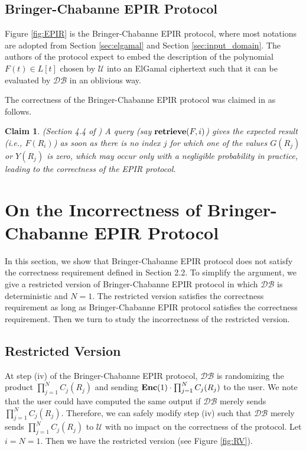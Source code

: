 \documentclass[JMC]{degruyter-journal}
\newtheorem{claim}{Claim}[section]
\begin{document}
\subsection{Bringer-Chabanne EPIR Protocol  }


Figure \ref{fig:EPIR} is the Bringer-Chabanne EPIR protocol, where  most notations are adopted from
 Section \ref{sec:elgamal} and Section \ref{sec:input_domain}.
The authors of the protocol expect to embed the description of the
polynomial $F(t)\in L[t]$ chosen by $\mathcal{U}$ into an ElGamal
ciphertext such that it can be evaluated by $\mathcal{DB}$ in an
oblivious way.

\newpage

The correctness of the Bringer-Chabanne EPIR protocol was claimed in \cite{BC09} as follows.
\begin{claim}\label{clm:correctness}
{\em (Section 4.4 of \cite{BC09})} A query {\em (say ${\bf
retrieve}(F,i)$)} gives the expected result
 {\em (i.e., $F(R_i)$)} as soon as there is no index $j$ for which one
of the values $G(R_j)$ or $Y(R_j)$ is zero, which may occur only
with a negligible probability in practice, leading to the
correctness of the EPIR protocol.
\end{claim}










\section{On the Incorrectness of Bringer-Chabanne EPIR Protocol}

In this section, we show that Bringer-Chabanne EPIR protocol does not satisfy the
correctness requirement defined in Section 2.2.   To simplify the
argument, we  give a  restricted version of Bringer-Chabanne EPIR protocol in which
$\mathcal{DB}$ is deterministic and  $N=1$. The restricted version
satisfies the correctness requirement as long as  Bringer-Chabanne EPIR protocol
 satisfies the correctness requirement. Then we turn to study  the incorrectness of the restricted version.






\subsection{Restricted Version}
At step (iv) of  the Bringer-Chabanne EPIR protocol, $\mathcal{DB}$ is
randomizing the product  $ \prod_{j=1}^{N}C_{j}(R_j)$ and sending
 ${\bf Enc}(1) \cdot \prod_{j=1}^{N}C_{j}(R_j)$ to the user.
We  note that the user could have computed the same output if $\mathcal{DB}$ merely
 sends  $ \prod_{j=1}^{N}C_{j}(R_j)$.
Therefore, we can safely modify step (iv) such that $\mathcal{DB}$
merely sends  $ \prod_{j=1}^{N}C_{j}(R_j)$  to $\mathcal{U}$
 with no impact on the correctness of the protocol. Let $i=N=1$.
  Then we have the restricted version (see Figure \ref{fig:RV}).
\end{document}
